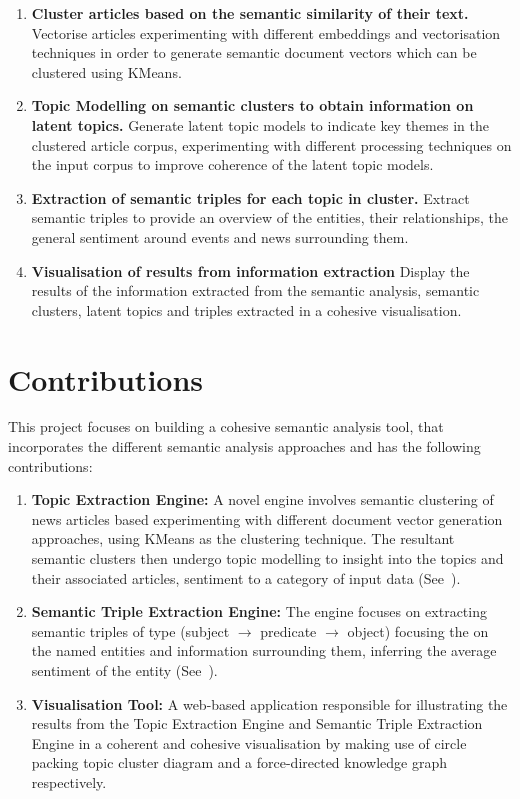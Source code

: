\begin{enumerate}
    \item \textbf{Cluster articles based on the semantic similarity of their text.} Vectorise articles experimenting with different embeddings and vectorisation techniques in order to generate semantic document vectors which can be clustered using KMeans.  

    \item \textbf{Topic Modelling on semantic clusters to obtain information on latent topics.} Generate latent topic models to indicate key themes in the clustered article corpus, experimenting with different processing techniques on the input corpus to improve coherence of the latent topic models.

    \item \textbf{Extraction of semantic triples for each topic in cluster.} Extract semantic triples to provide an overview of the entities, their relationships, the general sentiment around events and news surrounding them.

    \item \textbf{Visualisation of results from information extraction} Display the results of the information extracted from the semantic analysis, semantic clusters, latent topics and triples extracted in a cohesive visualisation.  
    
\end{enumerate}

\section{Contributions} \label{contributions}

This project focuses on building a cohesive semantic analysis tool, that incorporates the different semantic analysis approaches and has the following contributions: 
 
\begin{enumerate}
    \item \textbf{Topic Extraction Engine:} A novel engine involves semantic clustering of news articles based experimenting with different document vector generation approaches, using KMeans as the clustering technique. The resultant semantic clusters then undergo topic modelling to insight into the topics and their associated articles, sentiment to a category of input data (See~).

    \item \textbf{Semantic Triple Extraction Engine:} The engine focuses on extracting semantic triples of type (subject $\rightarrow$ predicate $\rightarrow$ object) focusing the on the named entities and information surrounding them, inferring the average sentiment of the entity (See~).
  
    \item \textbf{Visualisation Tool:} A web-based application responsible for illustrating the results from the Topic Extraction Engine and Semantic Triple Extraction Engine in a coherent and cohesive visualisation by making use of circle packing topic cluster diagram and a force-directed knowledge graph respectively. 


\end{enumerate}


